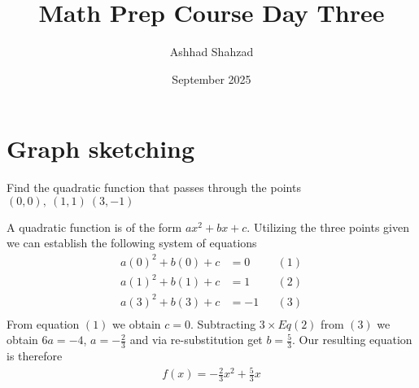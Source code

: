 \documentclass[a4paper]{article}
\title{Math Prep Course Day Three}
\author{Ashhad Shahzad}
\date{September 2025}
\begin{document}
\maketitle

\section{Graph sketching}

\begin{question}
Find the quadratic function that passes through the points \((0,0),\ (1,1)\ (3, -1)\)
\end{question}
A quadratic function is of the form \(ax^2 + bx + c\). Utilizing the three points given we can establish the following system of equations
\begin{align*}
a(0)^2 + b(0) + c &= 0 && (1)\\
a(1)^2 + b(1) + c &= 1 && (2)\\
a(3)^2 + b(3) + c &= -1 && (3)\\
\end{align*}
From equation \((1)\) we obtain \(c=0\). Subtracting \(3 \times Eq(2)\) from \((3)\) we obtain \(6a = -4\), \(a=-\frac{2}{3}\) and via re-substitution get \(b= \frac{5}{3}\). Our resulting equation is therefore
\begin{align*}
f(x) =-\frac{2}{3}x^2 + \frac{5}{3}x\\
\end{align*}

\begin{center}
\end{center}
\end{document}

